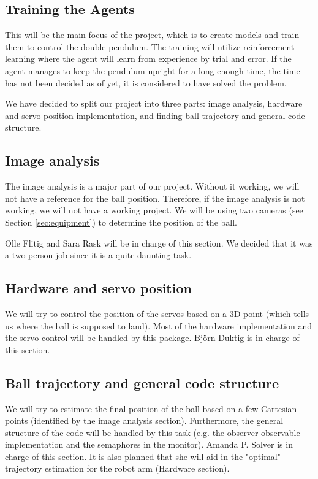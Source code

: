 \documentclass{article}
\begin{document}
\subsection{Training the Agents}
This will be the main focus of the project, which is to create models and train them to control the double pendulum.
The training will utilize reinforcement learning where the agent will learn from experience by trial and error.
If the agent manages to keep the pendulum upright for a long enough time, the time has not been decided as of yet, it is considered to have solved the problem.


We have decided to split our project into three parts: image analysis, hardware and servo position implementation, and finding ball trajectory and general code structure.
	\subsection{Image analysis}
        The image analysis is a major part of our project. Without it working, we will not have a reference for the ball position. Therefore, if the image analysis is not working, we will not have a working project. We will be using two cameras (see Section \ref{sec:equipment}) to determine the position of the ball. 
    
        Olle Flitig and Sara Rask will be in charge of this section. We decided that it was a two person job since it is a quite daunting task.
    
    \subsection{Hardware and servo position}
        We will try to control the position of the servos based on a 3D point (which tells us  where the ball is supposed to land). Most of the hardware implementation and the servo control will be handled by this package. Björn Duktig is in charge of this section.
    
    \subsection{Ball trajectory and general code structure}
        We will try to estimate the final position of the ball based on a few Cartesian points (identified by the image analysis section). Furthermore, the general structure of the code will be handled by this task (e.g. the observer-observable implementation and the semaphores in the monitor). Amanda P. Solver is in charge of this section. It is also planned that she will aid in the "optimal" trajectory estimation for the robot arm (Hardware section).
\end{document}
